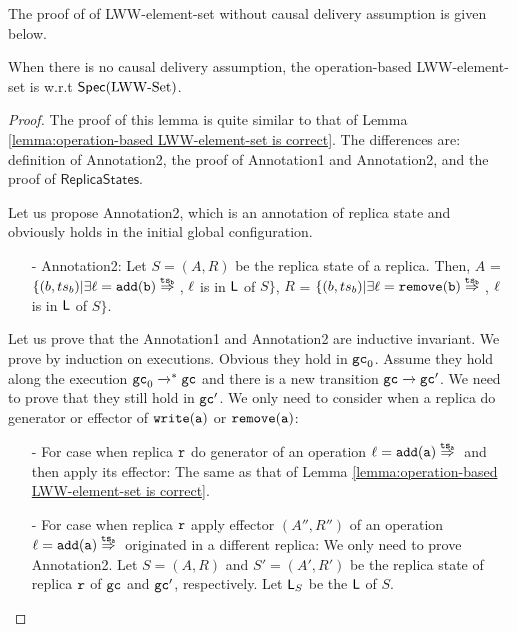 The proof of \crdtlin{} of LWW-element-set without causal delivery assumption is given below.

\begin{lemma}
\label{lemma:when there is no causal delivery assumption, operation-based LWW-element-set is correct is still correct}
When there is no causal delivery assumption, the operation-based LWW-element-set is \crdtlinearizable{} w.r.t $\mathsf{Spec}(\text{LWW\text{-}Set})$.
\end{lemma}


\begin {proof}

The proof of this lemma is quite similar to that of Lemma \ref{lemma:operation-based LWW-element-set is correct}. The differences are: definition of Annotation2, the proof of Annotation1 and Annotation2, and the proof of $\mathsf{ReplicaStates}$.

Let us propose Annotation2, which is an annotation of replica state and obviously holds in the initial global configuration.

\begin{itemize}
\setlength{\itemsep}{0.5pt}
\item[-] Annotation2: Let $S = (A,R)$ be the replica state of a replica. Then, $A$ =  $\{ (b,\ats_b) \vert \exists \alabel = \alabellongind[{\tt add}]{b}{}{\ats_b}{}$, $\ell$ is in $\mathsf{L}$ of $S\}$,
    $R$ =  $\{ (b,\ats_b) \vert \exists \alabel = \alabellongind[{\tt remove}]{b}{}{\ats_b}{}$, $\ell$ is in $\mathsf{L}$ of $S\}$.
\end{itemize}

Let us prove that the Annotation1 and Annotation2 are inductive invariant. We prove by induction on executions. Obvious they hold in $\mathtt{gc}_0$. Assume they hold along the execution $\mathtt{gc}_0 \xrightarrow{}^* \mathtt{gc}$ and there is a new transition $\mathtt{gc} \xrightarrow{} \mathtt{gc}'$. We need to prove that they still hold in $\mathtt{gc}'$. We only need to consider when a replica do generator or effector of $\alabelshort[{\tt write}]{a}$ or $\alabelshort[{\tt remove}]{a}$:

\begin{itemize}
\setlength{\itemsep}{0.5pt}
\item[-] For case when replica $\mathtt{r}$ do generator of an operation $\alabel = \alabellongind[{\tt add}]{a}{}{\ats_a}{}$ and then apply its effector: The same as that of Lemma \ref{lemma:operation-based LWW-element-set is correct}.

\item[-] For case when replica $\mathtt{r}$ apply effector $(A'',R'')$ of an operation $\alabel = \alabellongind[{\tt add}]{a}{}{\ats_a}{}$ originated in a different replica: We only need to prove Annotation2. Let $S=(A,R)$ and $S'=(A',R')$ be the replica state of replica $\mathtt{r}$ of $\mathtt{gc}$ and $\mathtt{gc}'$, respectively. Let $\mathsf{L}_S$ be the $\mathsf{L}$ of $S$.


\end{itemize}
\end{proof}

